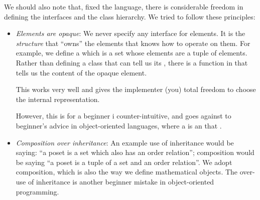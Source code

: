 We should also note that, fixed the language, there is considerable freedom in defining the interfaces and the class hierarchy.
We tried to follow these principles:
\begin{itemize}
    \item \emph{Elements are opaque}: We never specify any interface for elements.
          It is the \emph{structure} that ``owns'' the elements that knows how to operate on them.
          For example, we define a  which is a set whose elements are a tuple of elements.
          Rather than defining a class  that can tell us its , there is a  function  in  that tells us the content of the opaque element.

          This works very well and gives the implementer (you) total freedom to choose the internal representation.

          However, this is for a beginner i counter-intuitive, and goes against to beginner's advice in object-oriented languages, where a  is an  that .

    \item \emph{Composition over inheritance}: An example use of inheritance would be saying: ``a poset is a set which also has an order relation''; composition would be saying ``a poset is a tuple of a set and an order relation''.
          We adopt composition, which is also the way we define mathematical objects.
          The over-use of inheritance is another beginner mistake in object-oriented programming.

\end{itemize}

